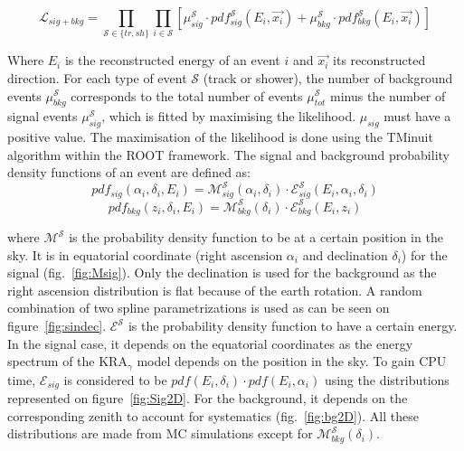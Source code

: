 \documentclass[final,twoside,onecolumn,10pt]{article}
\begin{document}
	\begin{equation}
			\mathcal{L}_{sig+bkg} = \prod\limits_{\mathcal{S} \in \{ tr, sh \} } \prod\limits_{i \in \mathcal{S}}[\mu_{sig}^\mathcal{S}\cdot pdf_{sig}^\mathcal{S}(E_i, \vec{x_i})+\mu_{bkg}^\mathcal{S}\cdot pdf_{bkg}^\mathcal{S}(E_i, \vec{x_i})]
	\end{equation}

	
	Where $E_i$ is the reconstructed energy of an event $i$ and $\vec{x_i}$ its reconstructed direction. For each type of event $\mathcal{S}$ (track or shower), the number of background events $\mu_{bkg}^\mathcal{S}$ corresponds to the total number of events $\mu_{tot}^\mathcal{S}$ minus the number of signal events $\mu_{sig}^\mathcal{S}$, which is fitted by maximising the likelihood. $\mu_{sig}$ must have a positive value. The maximisation of the likelihood is done using the TMinuit algorithm within the ROOT framework.
	The signal and background probability density functions of an event are defined as:
	\begin{equation}
		pdf_{sig}(α_i, δ_i, E_i) = \mathcal{M}_{sig}^\mathcal{S}(α_i, δ_i) \cdot \mathcal{E}_{sig}^\mathcal{S}(E_i, α_i, δ_i)
	\end{equation}
	\begin{equation}
		pdf_{bkg}(z_i, δ_i, E_i) = \mathcal{M}_{bkg}^\mathcal{S}(δ_i) \cdot \mathcal{E}_{bkg}^\mathcal{S}(E_i, z_i)
	\end{equation}

	where $\mathcal{M}^\mathcal{S}$ is the probability density function to be at a certain position in the sky. It is in equatorial coordinate (right ascension $α_i$ and declination $δ_i$) for the signal (fig.~\ref{fig:Msig}). Only the declination is used for the background as the right ascension distribution is flat because of the earth rotation. A random combination of two spline parametrizations is used as can be seen on figure~\ref{fig:sindec}.
	$\mathcal{E}^\mathcal{S}$ is the probability density function to have a certain energy. In the signal case, it depends on the equatorial coordinates as the energy spectrum of the KRA$_γ$ model depends on the position in the sky. To gain CPU time, $\mathcal{E}_{sig}$ is considered to be $pdf(E_i, δ_i) \cdot pdf(E_i, α_i)$ using the distributions represented on figure~\ref{fig:Sig2D}. For the background, it depends on the corresponding zenith to account for systematics (fig.~\ref{fig:bg2D}). All these distributions are made from MC simulations except for $\mathcal{M}_{bkg}^\mathcal{S}(δ_i)$.
\end{document}
